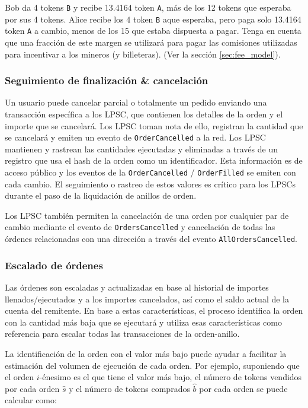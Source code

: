 \documentclass[UTF8,nofonts]{article}
\begin{document}
\begin{multicols}{2}
Bob da 4 tokens \verb|B| y recibe 13.4164 token \verb|A|, m\'as de los 12 tokens que esperaba por sus 4 tokens. Alice recibe los 4 token \verb|B| aque esperaba, pero paga solo 13.4164 token \verb|A| a cambio, menos de los 15 que estaba dispuesta a pagar. Tenga en cuenta que una fracci\'on de este margen se utilizar\'a para pagar las comisiones utilizadas para incentivar a los mineros (y billeteras). (Ver la secci\'on \ref{sec:fee_model}).


\subsubsection{Seguimiento de finalizaci\'on \& cancelaci\'on}

Un usuario puede cancelar parcial o totalmente un pedido enviando una transacci\'on espec\'ifica a los LPSC, que contienen los detalles de la orden y el importe que se cancelar\'a. Los LPSC toman nota de ello, registran la cantidad que se cancelar\'a y emiten un evento de \verb|OrderCancelled| a la red. Los LPSC mantienen y rastrean las cantidades ejecutadas y eliminadas a trav\'es de un registro que usa el hash de la orden como un identificador. Esta informaci\'on es de acceso p\'ublico y los eventos de la \verb|OrderCancelled| / \verb|OrderFilled| se emiten con cada cambio. El seguimiento o rastreo de estos valores es cr\'itico para los LPSCs durante el paso de la liquidaci\'on de anillos de orden. 

Los LPSC tambi\'en permiten la cancelaci\'on de una orden por cualquier par de cambio mediante el evento de \verb|OrdersCancelled| y cancelaci\'on de todas las \'ordenes relacionadas con una direcci\'on a trav\'es del evento \verb|AllOrdersCancelled|.


\subsubsection{Escalado de \'ordenes\label{sec:order_scaling}}
Las \'ordenes son escaladas y actualizadas en base al historial de importes llenados/ejecutados y a los importes cancelados, as\'i como el saldo actual de la cuenta del remitente. En base a estas caracter\'isticas, el proceso identifica la orden con la cantidad m\'as baja que se ejecutar\'a y utiliza esas caracter\'isticas como referencia para escalar todas las transacciones de la orden-anillo.

La identificaci\'on de la orden con el valor m\'as bajo puede ayudar a facilitar la estimaci\'on del volumen de ejecuci\'on de cada orden. Por ejemplo, suponiendo que el orden $i$-\'enesimo es el que tiene el valor m\'as bajo, el n\'umero de tokens vendidos por cada orden $\hat{s}$ y el n\'umero de tokens comprados $\hat{b}$ por cada orden se puede calcular como:


\end{multicols}
\end{document}

